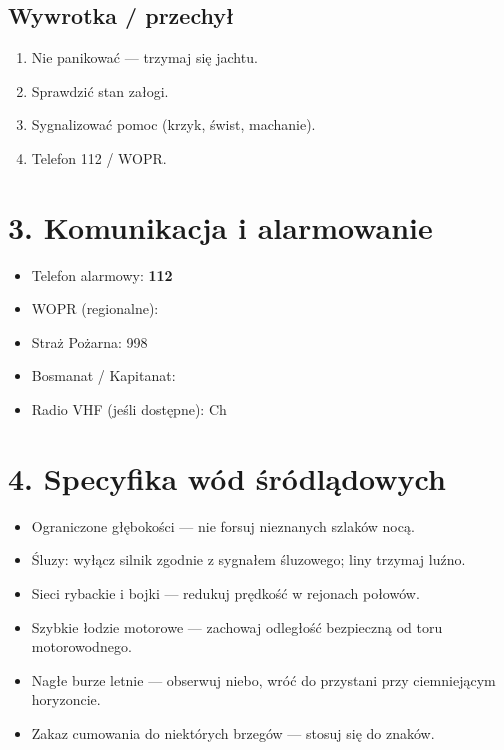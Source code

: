 \documentclass[a4paper,11pt]{article}
\begin{document}
\subsection*{Wywrotka / przechył}
\begin{enumerate}[noitemsep]
    \item Nie panikować — trzymaj się jachtu.
    \item Sprawdzić stan załogi.
    \item Sygnalizować pomoc (krzyk, świst, machanie).
    \item Telefon 112 / WOPR.
\end{enumerate}

\section*{3. Komunikacja i alarmowanie}

\begin{itemize}[noitemsep]
    \item Telefon alarmowy: \textbf{112}
    \item WOPR (regionalne): \field{6cm}
    \item Straż Pożarna: 998
    \item Bosmanat / Kapitanat: \field{6cm}
    \item Radio VHF (jeśli dostępne): Ch~\field{2cm}
\end{itemize}

\section*{4. Specyfika wód śródlądowych}

\begin{itemize}[noitemsep]
    \item Ograniczone głębokości — nie forsuj nieznanych szlaków nocą.
    \item Śluzy: wyłącz silnik zgodnie z sygnałem śluzowego; liny trzymaj luźno.
    \item Sieci rybackie i bojki — redukuj prędkość w rejonach połowów.
    \item Szybkie łodzie motorowe — zachowaj odległość bezpieczną od toru motorowodnego.
    \item Nagłe burze letnie — obserwuj niebo, wróć do przystani przy ciemniejącym horyzoncie.
    \item Zakaz cumowania do niektórych brzegów — stosuj się do znaków.
\end{itemize}
\end{document}
